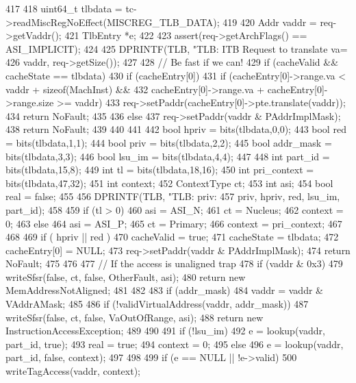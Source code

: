 \begin{DoxyCode}
417 {
418     uint64_t tlbdata = tc->readMiscRegNoEffect(MISCREG_TLB_DATA);
419 
420     Addr vaddr = req->getVaddr();
421     TlbEntry *e;
422 
423     assert(req->getArchFlags() == ASI_IMPLICIT);
424 
425     DPRINTF(TLB, "TLB: ITB Request to translate va=%
426             vaddr, req->getSize());
427 
428     // Be fast if we can!
429     if (cacheValid && cacheState == tlbdata) {
430         if (cacheEntry[0]) {
431             if (cacheEntry[0]->range.va < vaddr + sizeof(MachInst) &&
432                 cacheEntry[0]->range.va + cacheEntry[0]->range.size >= vaddr) {
433                 req->setPaddr(cacheEntry[0]->pte.translate(vaddr));
434                 return NoFault;
435             }
436         } else {
437             req->setPaddr(vaddr & PAddrImplMask);
438             return NoFault;
439         }
440     }
441 
442     bool hpriv = bits(tlbdata,0,0);
443     bool red = bits(tlbdata,1,1);
444     bool priv = bits(tlbdata,2,2);
445     bool addr_mask = bits(tlbdata,3,3);
446     bool lsu_im = bits(tlbdata,4,4);
447 
448     int part_id = bits(tlbdata,15,8);
449     int tl = bits(tlbdata,18,16);
450     int pri_context = bits(tlbdata,47,32);
451     int context;
452     ContextType ct;
453     int asi;
454     bool real = false;
455 
456     DPRINTF(TLB, "TLB: priv:%
457            priv, hpriv, red, lsu_im, part_id);
458 
459     if (tl > 0) {
460         asi = ASI_N;
461         ct = Nucleus;
462         context = 0;
463     } else {
464         asi = ASI_P;
465         ct = Primary;
466         context = pri_context;
467     }
468 
469     if ( hpriv || red ) {
470         cacheValid = true;
471         cacheState = tlbdata;
472         cacheEntry[0] = NULL;
473         req->setPaddr(vaddr & PAddrImplMask);
474         return NoFault;
475     }
476 
477     // If the access is unaligned trap
478     if (vaddr & 0x3) {
479         writeSfsr(false, ct, false, OtherFault, asi);
480         return new MemAddressNotAligned;
481     }
482 
483     if (addr_mask)
484         vaddr = vaddr & VAddrAMask;
485 
486     if (!validVirtualAddress(vaddr, addr_mask)) {
487         writeSfsr(false, ct, false, VaOutOfRange, asi);
488         return new InstructionAccessException;
489     }
490 
491     if (!lsu_im) {
492         e = lookup(vaddr, part_id, true);
493         real = true;
494         context = 0;
495     } else {
496         e = lookup(vaddr, part_id, false, context);
497     }
498 
499     if (e == NULL || !e->valid) {
500         writeTagAccess(vaddr, context);
}}
\end{DoxyCode}
